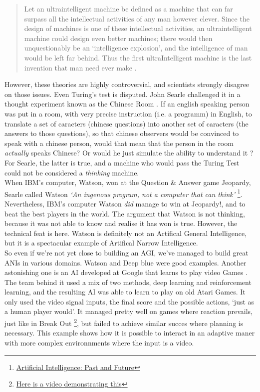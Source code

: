 \documentclass[12pt]{article}
\begin{document}
\smallskip

\begin{quotation}
   Let an ultraintelligent machine be defined as a machine that can far surpass
   all the intellectual activities of any man however clever. Since the design
   of machines is one of these intellectual activities, an ultraintelligent
   machine could design even better machines; there would then unquestionably be
   an \lq intelligence explosion\rq , and the intelligence of man would be left
   far behind. Thus the first ultraIntelligent machine is the last invention
   that man need ever make \cite{Good}.
\end{quotation}

However, these theories are highly controversial, and scientists strongly
disagree on those issues. Even Turing's test is disputed. John Searle challenged
it in a thought experiment known as the Chinese Room \cite{ChineseRoom}. If an
english speaking person was put in a room, with very precise instruction (i.e. a
programm) in English, to translate a set of caracters (chinese questions) into
another set of caracters (the answers to those questions), so that chinese
observers would be convinced to speak with a chinese person, would that mean
that the person in the room {\em actually} speaks Chinese? Or would he just
simulate the ability to understand it ? For Searle, the latter is true, and a
machine who would pass the Turing Test could not be considered a {\em thinking}
machine. \\

When IBM's computer, Watson, won at the Question \& Answer game Jeopardy, Searle
called Watson \textit{\lq  An ingenous program, not a computer that can
think\rq} \footnote{
\href{http://cacm.acm.org/magazines/2012/1/144824-artificial-intelligence-past-and-future/fulltext}
{Artificial Intelligence: Past and Future}}. Nevertheless, IBM's computer Watson
{\em did} manage to win at Jeopardy!, and to beat the best players in the world.
The argument that Watson is not thinking, because it was not able to know and
realise it has won is true. However, the technical feat is here. Watson is
definitely not an Artifical General Intelligence, but it is a spectacular
example of Artifical Narrow Intelligence. \\

So even if we're not yet close to building an \gls{AGI}, we've managed to build
great \gls{ANI}s in various domains. Watson and Deep blue were good examples.
Another astonishing one is an AI developed at Google that learns to play video
Games \cite{Atari}. The team behind it used a mix of two methods, deep learning
and reinforcement learning, and the resulting AI was able to learn to play on
old Atari Games. It only used the video signal inputs, the final score and the
possible actions, \lq just as a human player would\rq. It managed pretty well on
games where reaction prevails, just like in Break Out
\footnote{\href{https://www.youtube.com/watch?v=cjpEIotvwFY} {Here is a video
demonstrating this}}, but failed to achieve similar succes where planning is
necessary. This example shows how it is possible to interact in an adaptive
maner with more complex environnments where the input is a video. \\
\end{document}

